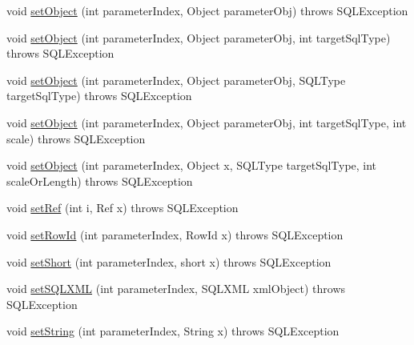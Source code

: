 \begin{DoxyCompactItemize}
\item 
void \mbox{\hyperlink{classcom_1_1mysql_1_1cj_1_1jdbc_1_1_client_prepared_statement_a451a40535568626b22b4f25efcf6c1b7}{set\+Object}} (int parameter\+Index, Object parameter\+Obj)  throws S\+Q\+L\+Exception 
\item 
void \mbox{\hyperlink{classcom_1_1mysql_1_1cj_1_1jdbc_1_1_client_prepared_statement_a31009d98b9af8a8b478fcb2cf6a18c66}{set\+Object}} (int parameter\+Index, Object parameter\+Obj, int target\+Sql\+Type)  throws S\+Q\+L\+Exception 
\item 
void \mbox{\hyperlink{classcom_1_1mysql_1_1cj_1_1jdbc_1_1_client_prepared_statement_a4eafbeb86813ff6ed2b2230591acb02c}{set\+Object}} (int parameter\+Index, Object parameter\+Obj, S\+Q\+L\+Type target\+Sql\+Type)  throws S\+Q\+L\+Exception 
\item 
void \mbox{\hyperlink{classcom_1_1mysql_1_1cj_1_1jdbc_1_1_client_prepared_statement_a977059e7887ef311143630f64b8c4ec9}{set\+Object}} (int parameter\+Index, Object parameter\+Obj, int target\+Sql\+Type, int scale)  throws S\+Q\+L\+Exception 
\item 
void \mbox{\hyperlink{classcom_1_1mysql_1_1cj_1_1jdbc_1_1_client_prepared_statement_aad13bcb6ca30f06be1995faea1b06581}{set\+Object}} (int parameter\+Index, Object x, S\+Q\+L\+Type target\+Sql\+Type, int scale\+Or\+Length)  throws S\+Q\+L\+Exception 
\item 
void \mbox{\hyperlink{classcom_1_1mysql_1_1cj_1_1jdbc_1_1_client_prepared_statement_ab5f7a37435847dcb4ab8d3c5344089a3}{set\+Ref}} (int i, Ref x)  throws S\+Q\+L\+Exception 
\item 
void \mbox{\hyperlink{classcom_1_1mysql_1_1cj_1_1jdbc_1_1_client_prepared_statement_a32f20ad87d972d4280b8a73619cd20a6}{set\+Row\+Id}} (int parameter\+Index, Row\+Id x)  throws S\+Q\+L\+Exception 
\item 
void \mbox{\hyperlink{classcom_1_1mysql_1_1cj_1_1jdbc_1_1_client_prepared_statement_a250604d8af34d3a9552b2bb59dac755f}{set\+Short}} (int parameter\+Index, short x)  throws S\+Q\+L\+Exception 
\item 
void \mbox{\hyperlink{classcom_1_1mysql_1_1cj_1_1jdbc_1_1_client_prepared_statement_a50024c63a48c0c29dc59d93f6e850524}{set\+S\+Q\+L\+X\+ML}} (int parameter\+Index, S\+Q\+L\+X\+ML xml\+Object)  throws S\+Q\+L\+Exception 
\item 
void \mbox{\hyperlink{classcom_1_1mysql_1_1cj_1_1jdbc_1_1_client_prepared_statement_a17c72582ab7d937c28e2df3a6c4f9777}{set\+String}} (int parameter\+Index, String x)  throws S\+Q\+L\+Exception 

\end{DoxyCompactItemize}
